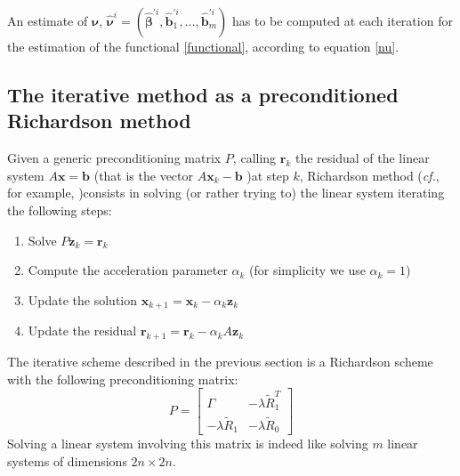 An estimate of $\bm{\nu}$, $\hat{\bm{\nu}}^i = (\hat{\bm{\beta}}^{\prime i}, \hat{\bm{b}}_1^{\prime i}, \dots, \hat{\bm{b}}_m^{\prime i})$ has to be computed at each iteration for the estimation of the functional \ref{functional}, according to equation \ref{nu}.

\subsection{The iterative method as a preconditioned Richardson method}
Given a generic preconditioning matrix $P$, calling $\bm{r}_k$ the residual of the linear system $A \bm{x} = \bm{b}$ (that is the vector $A \bm{x}_k - \bm{b}$ )at step $k$,
Richardson method (\textit{cf.}, for example, \cite{Quarteroni})consists in solving (or rather trying to) the linear system iterating the following steps:
\begin{enumerate}
    \item Solve $P \bm{z}_k = \bm{r}_k$
    \item Compute the acceleration parameter $\alpha_k$ (for simplicity we use $\alpha_k = 1$)
    \item Update the solution $ \bm{x}_{k+1} = \bm{x}_{k} - \alpha_k \bm{z}_k $
    \item Update the residual $\bm{r}_{k+1} = \bm{r}_{k} - \alpha_k A \bm{z}_k$
\end{enumerate}

The iterative scheme described in the previous section is a Richardson scheme with the following preconditioning matrix:
\begin{equation}
    \label{precond}
    P=
    \begin{bmatrix}
        \Gamma & -\lambda \tilde{R}_1^T\\
        -\lambda \tilde{R}_1  & -\lambda \tilde{R}_0
    \end{bmatrix}
\end{equation}
Solving a linear system involving this matrix is indeed like solving $m$ linear systems of dimensions $2n\times 2n$.
